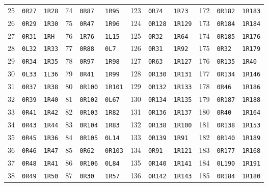 \begin{center}
\begin{tabular}{rll@{\qquad}rll@{\qquad}rll@{\qquad}rll}
25 & \texttt{0R27} & \texttt{1R28} & 74 & \texttt{0R87} & \texttt{1R95} & 123 & \texttt{0R74} & \texttt{1R73} & 172 & \texttt{0R182} & \texttt{1R183}\\
26 & \texttt{0R29} & \texttt{1R30} & 75 & \texttt{0R47} & \texttt{1R96} & 124 & \texttt{0R128} & \texttt{1R129} & 173 & \texttt{0R184} & \texttt{1R184}\\
27 & \texttt{0R31} & \texttt{1RH} & 76 & \texttt{1R76} & \texttt{1L15} & 125 & \texttt{0R32} & \texttt{1R64} & 174 & \texttt{0R185} & \texttt{1R176}\\
28 & \texttt{0L32} & \texttt{1R33} & 77 & \texttt{0R88} & \texttt{0L7} & 126 & \texttt{0R31} & \texttt{1R92} & 175 & \texttt{0R32} & \texttt{1R179}\\
29 & \texttt{0R34} & \texttt{1R35} & 78 & \texttt{0R97} & \texttt{1R98} & 127 & \texttt{0R63} & \texttt{1R127} & 176 & \texttt{0R135} & \texttt{1R40}\\
30 & \texttt{0L33} & \texttt{1L36} & 79 & \texttt{0R41} & \texttt{1R99} & 128 & \texttt{0R130} & \texttt{1R131} & 177 & \texttt{0R134} & \texttt{1R146}\\
31 & \texttt{0R37} & \texttt{1R38} & 80 & \texttt{0R100} & \texttt{1R101} & 129 & \texttt{0R132} & \texttt{1R133} & 178 & \texttt{0R46} & \texttt{1R186}\\
32 & \texttt{0R39} & \texttt{1R40} & 81 & \texttt{0R102} & \texttt{0L67} & 130 & \texttt{0R134} & \texttt{1R135} & 179 & \texttt{0R187} & \texttt{1R188}\\
33 & \texttt{0R41} & \texttt{1R42} & 82 & \texttt{0R103} & \texttt{1R82} & 131 & \texttt{0R136} & \texttt{1R137} & 180 & \texttt{0R40} & \texttt{1R164}\\
34 & \texttt{0R43} & \texttt{1R44} & 83 & \texttt{0R104} & \texttt{1R83} & 132 & \texttt{0R138} & \texttt{1R100} & 181 & \texttt{0R138} & \texttt{1R153}\\
35 & \texttt{0R45} & \texttt{1R36} & 84 & \texttt{0R105} & \texttt{0L14} & 133 & \texttt{0R139} & \texttt{1R91} & 182 & \texttt{0R140} & \texttt{1R189}\\
36 & \texttt{0R46} & \texttt{1R47} & 85 & \texttt{0R62} & \texttt{0R103} & 134 & \texttt{0R91} & \texttt{1R121} & 183 & \texttt{0R177} & \texttt{1R168}\\
37 & \texttt{0R48} & \texttt{1R41} & 86 & \texttt{0R106} & \texttt{0L84} & 135 & \texttt{0R140} & \texttt{1R141} & 184 & \texttt{0L190} & \texttt{1R191}\\
38 & \texttt{0R49} & \texttt{1R50} & 87 & \texttt{0R30} & \texttt{1R57} & 136 & \texttt{0R142} & \texttt{1R143} & 185 & \texttt{0R184} & \texttt{1R180}\\

\end{tabular}
\end{center}
